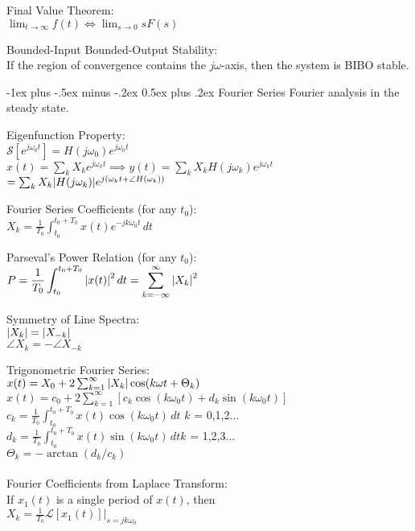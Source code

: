\documentclass[12pt,landscape,letterpaper]{article}
\makeatletter
\renewcommand{\section}{\@startsection{section}{1}{0mm}%
                                {-1ex plus -.5ex minus -.2ex}%
                                {0.5ex plus .2ex}%
                                {\normalfont\normalsize\bfseries}}
\newcommand{\tab}{\hspace{0.02\textwidth}}
\newcommand{\ds}{\displaystyle}
\makeatother
\begin{document}
\begin{multicols*}{3}
Final Value Theorem:\\
\tab $\ds \lim_{t\rightarrow\infty} f(t) \Leftrightarrow \lim_{s\rightarrow 0} sF(s)$

Bounded-Input Bounded-Output Stability:\\
\tab If the region of convergence contains the $j\omega$-axis, then the system is BIBO stable.

\section{Fourier Series}
\tab Fourier analysis in the steady state.

Eigenfunction Property:\\
\tab $\mathcal{S}[e^{j\omega_0t}] = H(j\omega_0)e^{j\omega_0t}$\\
\tab $x(t) = \sum_k X_k e^{j\omega_kt} \implies y(t) = \sum_k X_k H(j\omega_k)e^{j\omega_kt}$\\\vspace{1mm}\hspace{2.5cm}$= \sum_k X_k \abs{H(j\omega_k)}e^{j(\omega_kt + \angle H(\omega_k))}$

Fourier Series Coefficients (for any $t_0$):\\
\tab $\ds X_k = \frac{1}{T_0}\int_{t_0}^{t_0 + T_0}x(t)e^{-jk\omega_0t}\,dt$

Parseval's Power Relation (for any $t_0$):\\
\tab $\ds P = \frac{1}{T_0} \int_{t_0}^{t_0 + T_0}\abs{x(t)}^2\,dt = \sum_{k = -\infty}^{\infty}\abs{X_k}^2$

Symmetry of Line Spectra:\\
\tab $\abs{X_k} = \abs{X_{-k}}$\\
\tab $\angle X_k = -\angle X_{-k}$

Trigonometric Fourier Series:\\
\tab $x(t) = X_0 + 2\sum_{k = 1}^{\infty}\abs{X_k}\cos(k\omega t + \Theta_k)$\\
\tab $x(t) = c_0 + 2\sum_{k = 1}^{\infty}[c_k\cos(k\omega_0 t) + d_k\sin(k\omega_0 t)]$\\
\tab $c_k = \frac{1}{T_0} \int_{t_0}^{t_0 + T_0}x(t)\cos(k\omega_0 t)\,dt$ \quad $k$ = 0,1,2$\ldots$\\
\tab $d_k = \frac{1}{T_0} \int_{t_0}^{t_0 + T_0}x(t)\sin(k\omega_0 t)\,dt$\quad $k$ = 1,2,3$\ldots$\\
\tab $\Theta_k = -\arctan(d_k/c_k)$
\\~\\
Fourier Coefficients from Laplace Transform:\\
\tab If $x_1(t)$ is a single period of $x(t)$, then\\
\tab $X_k = \frac{1}{T_0}\mathcal{L}[x_1(t)] \big\rvert_{s = jk\omega_0}$


\end{multicols*}
\end{document}
